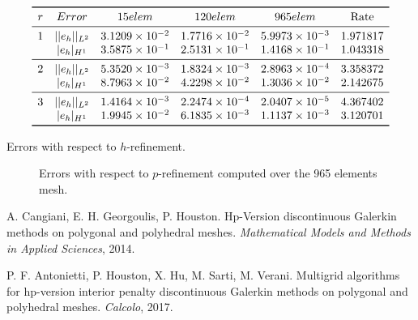 \documentclass[12pt, a4paper]{article}
\begin{document}
\begin{table}[h]
	\centering
	\[
	\begin{array}{cccccc}
	\toprule
	r & Error & 15 elem & 120 elem & 965 elem & \text{Rate} \\ 
	\midrule
	1 & ||e_{h}||_{L^2} & 3.1209 \times 10^{-2} & 1.7716 \times 10^{-2} & 5.9973 \times 10^{-3} & 1.971817\\
	  & |e_{h}|_{H^1}   & 3.5875 \times 10^{-1} & 2.5131 \times 10^{-1} & 1.4168 \times 10^{-1} & 1.043318\\
	\midrule
	2 & ||e_{h}||_{L^2} & 5.3520 \times 10^{-3} & 1.8324 \times 10^{-3} & 2.8963 \times 10^{-4} & 3.358372\\
	  & |e_{h}|_{H^1}   & 8.7963 \times 10^{-2} & 4.2298 \times 10^{-2} & 1.3036 \times 10^{-2} & 2.142675\\
	\midrule
	3 & ||e_{h}||_{L^2} & 1.4164 \times 10^{-3} & 2.2474 \times 10^{-4} & 2.0407 \times 10^{-5} & 4.367402\\
	  & |e_{h}|_{H^1}   & 1.9945 \times 10^{-2} & 6.1835 \times 10^{-3} & 1.1137 \times 10^{-3} & 3.120701\\
	\bottomrule
	\end{array}
	\]
	\caption{Errors with respect to $h$-refinement.}
\end{table}

\begin{figure}[h!]
	\centering
	\caption{Errors with respect to $p$-refinement computed over the 965 elements mesh.}
\end{figure}


\begin{thebibliography}{9}
	A. Cangiani, E. H. Georgoulis, P. Houston. Hp-Version
	discontinuous Galerkin methods on polygonal and polyhedral meshes. \textit{Mathematical Models and Methods in Applied Sciences}, 2014.
	
	P. F. Antonietti, P. Houston, X. Hu, M. Sarti, M. Verani. Multigrid algorithms for hp-version interior penalty
	discontinuous Galerkin methods on polygonal and
	polyhedral meshes. \textit{Calcolo}, 2017.
\end{thebibliography}
\end{document}
